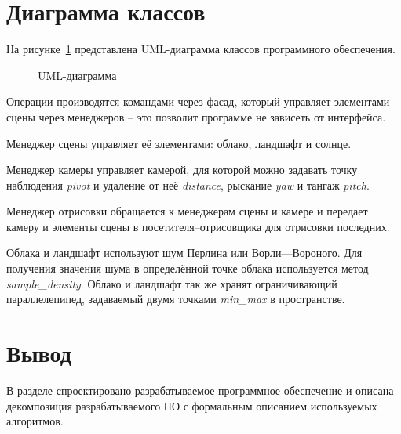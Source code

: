 \section{Диаграмма классов}
На рисунке~\ref{fig:uml} представлена UML-диаграмма классов программного обеспечения.

\begin{figure}[ht!]
	\centering
	   
	\caption{UML-диаграмма}
	\label{fig:uml}
\end{figure}

Операции производятся командами через фасад, который управляет элементами сцены через менеджеров -- это позволит программе не зависеть от интерфейса. 

Менеджер сцены управляет её элементами: облако, ландшафт и солнце.

Менеджер камеры управляет камерой, для которой можно задавать точку наблюдения \textit{pivot} и удаление от неё \textit{distance}, рыскание \textit{yaw} и тангаж \textit{pitch}.

Менеджер отрисовки обращается к менеджерам сцены и камере и передает камеру и элементы сцены в посетителя--отрисовщика для отрисовки последних.

Облака и ландшафт используют шум Перлина или Ворли---Вороного. Для получения значения шума в определённой точке облака используется метод \textit{sample\_density}. Облако и ландшафт так же хранят ограничивающий параллелепипед, задаваемый двумя точками \textit{min\_max} в пространстве.

\section*{Вывод}
В разделе спроектировано разрабатываемое программное обеспечение и описана декомпозиция разрабатываемого ПО с формальным описанием используемых алгоритмов.
